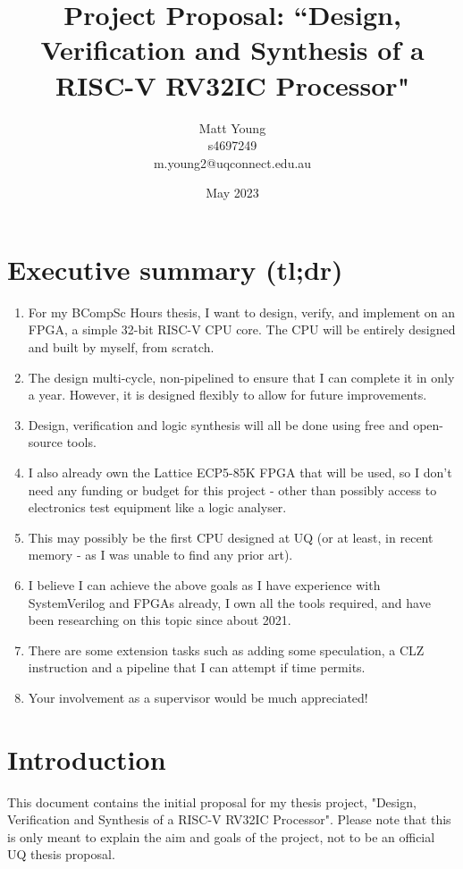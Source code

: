 \documentclass{article}
\title{\textbf{Project Proposal: ``Design, Verification and Synthesis of a RISC-V RV32IC Processor"}}
\author{Matt Young \\ s4697249 \\ m.young2@uqconnect.edu.au}
\date{May 2023}
\begin{document}
\maketitle

\tableofcontents

\section{Executive summary (tl;dr)}
\begin{enumerate}
	\item For my BCompSc Hours thesis, I want to design, verify, and implement on an FPGA, a simple 32-bit 
		  RISC-V CPU core. The CPU will be entirely designed and built by myself, from scratch.
	\item The design multi-cycle, non-pipelined to ensure that I can complete it in only a year. However, it
		  is designed flexibly to allow for future improvements.
	\item Design, verification and logic synthesis will all be done using free and open-source tools.
	\item I also already own the Lattice ECP5-85K FPGA that will be used, so I don't need any funding or budget for
	      this project - other than possibly access to electronics test equipment like a logic analyser.
	\item This may possibly be the first CPU designed at UQ (or at least, in recent memory - as I was unable to find
	      any prior art).
	\item I believe I can achieve the above goals as I have experience with SystemVerilog and FPGAs already, I own all
	      the tools required, and have been researching on this topic since about 2021.
	\item There are some extension tasks such as adding some speculation, a CLZ instruction and a pipeline
		  that I can attempt if time permits.
	\item Your involvement as a supervisor would be much appreciated!
\end{enumerate}

\section{Introduction}
This document contains the initial proposal for my thesis project, "Design, Verification and Synthesis of a
RISC-V RV32IC Processor". Please note that this is only meant to explain the aim and goals of the project,
not to be an official UQ thesis proposal.
\end{document}
